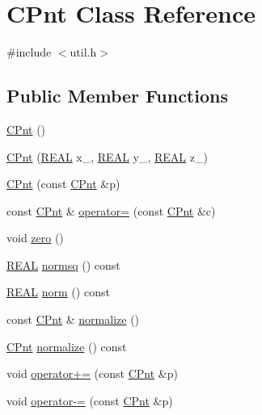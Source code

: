 \hypertarget{classCPnt}{\section{C\-Pnt Class Reference}
\label{classCPnt}
}


{\ttfamily \#include $<$util.\-h$>$}

\subsection*{Public Member Functions}
\begin{DoxyCompactItemize}
\item 
\hyperlink{classCPnt_a6792dcfc8b95c18c03bda5a6dde7765a}{C\-Pnt} ()
\item 
\hyperlink{classCPnt_a91907d073421cdf75000d27f982f058b}{C\-Pnt} (\hyperlink{util_8h_a5821460e95a0800cf9f24c38915cbbde}{R\-E\-A\-L} x\-\_\-, \hyperlink{util_8h_a5821460e95a0800cf9f24c38915cbbde}{R\-E\-A\-L} y\-\_\-, \hyperlink{util_8h_a5821460e95a0800cf9f24c38915cbbde}{R\-E\-A\-L} z\-\_\-)
\item 
\hyperlink{classCPnt_aca4d8d7044e71700128b497cfcc4f1d8}{C\-Pnt} (const \hyperlink{classCPnt}{C\-Pnt} \&p)
\item 
const \hyperlink{classCPnt}{C\-Pnt} \& \hyperlink{classCPnt_abd18aa7c83ac70f5e73847a8cd154e9d}{operator=} (const \hyperlink{classCPnt}{C\-Pnt} \&c)
\item 
void \hyperlink{classCPnt_a619a71665a5a40fddbc8e6c6a6b450cc}{zero} ()
\item 
\hyperlink{util_8h_a5821460e95a0800cf9f24c38915cbbde}{R\-E\-A\-L} \hyperlink{classCPnt_ac4dcf209c35c4ef0c119cd59fbddd18f}{normsq} () const 
\item 
\hyperlink{util_8h_a5821460e95a0800cf9f24c38915cbbde}{R\-E\-A\-L} \hyperlink{classCPnt_ab92f2e6cc3891ff6a00eddb483b854ab}{norm} () const 
\item 
const \hyperlink{classCPnt}{C\-Pnt} \& \hyperlink{classCPnt_a79e4515e6479905942ce4b48990943f0}{normalize} ()
\item 
\hyperlink{classCPnt}{C\-Pnt} \hyperlink{classCPnt_a59899074de56c4ad55583fc58d48ea0a}{normalize} () const 
\item 
void \hyperlink{classCPnt_ab9aa57d527e60e0ba46fd44ee515ebb0}{operator+=} (const \hyperlink{classCPnt}{C\-Pnt} \&p)
\item 
void \hyperlink{classCPnt_aad46f39ec4811f1f7c39b33b0ef55f42}{operator-\/=} (const \hyperlink{classCPnt}{C\-Pnt} \&p)
\item 

\end{DoxyCompactItemize}
